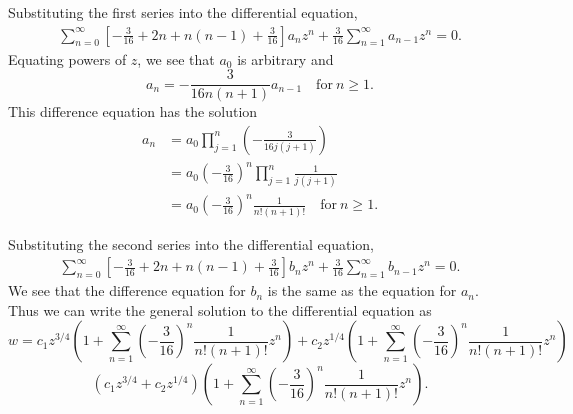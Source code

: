 \begin{Example}
  Substituting the first series into the differential equation,
  \begin{gather*}
    \sum_{n=0}^\infty \left[-\frac{3}{16} + 2n + n(n-1) + \frac{3}{16}\right]a_n z^n
    + \frac{3}{16} \sum_{n=1}^\infty a_{n-1} z^n = 0. 
  \end{gather*}
  Equating powers of $z$, we see that $a_0$ is arbitrary and
  \[ a_n = - \frac{3}{16n(n+1)} a_{n-1} \quad \mathrm{for}\ n \geq 1.\]
  This difference equation has the solution
  \begin{align*} 
    a_n &= a_0 \prod_{j=1}^n \left(-\frac{3}{16j(j+1)}\right) \\
    &= a_0 \left(-\frac{3}{16}\right)^n \prod_{j=1}^n \frac{1}{j(j+1)} \\
    &= a_0 \left(-\frac{3}{16}\right)^n \frac{1}{n!(n+1)!} 
    \quad \mathrm{for}\ n \geq 1.
  \end{align*}

  Substituting the second series into the differential equation,
  \begin{gather*}
    \sum_{n=0}^\infty \left[-\frac{3}{16} + 2n + n(n-1) + \frac{3}{16}\right]b_n z^n
    + \frac{3}{16} \sum_{n=1}^\infty b_{n-1} z^n = 0. 
  \end{gather*}
  We see that the difference equation for $b_n$ is the same as the 
  equation for $a_n$.  Thus we can write the general solution to the 
  differential equation as
  \[w = c_1 z^{3/4} \left(1 + \sum_{n=1}^\infty 
    \left(-\frac{3}{16}\right)^n \frac{1}{n!(n+1)!} z^n \right)
  + c_2 z^{1/4} \left(1 + \sum_{n=1}^\infty 
    \left(-\frac{3}{16}\right)^n \frac{1}{n!(n+1)!} z^n \right) \]
  \[ \boxed{ \left(c_1 z^{3/4} + c_2 z^{1/4}\right) \left(1 + \sum_{n=1}^\infty 
      \left(-\frac{3}{16}\right)^n \frac{1}{n!(n+1)!} z^n \right).}\]
\end{Example}











